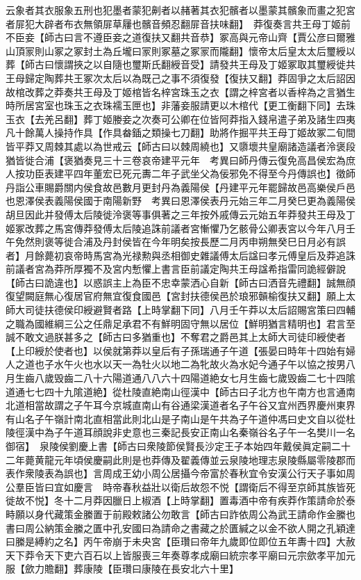 云象者其衣服象五刑也犯墨者蒙犯劓者以赭著其衣犯髕者以墨蒙其髕象而畫之犯宮者屝犯大辟者布衣無領屝草屨也髕音頻忍翻屝音扶味翻】　莽復奏言共王母丁姬前不臣妾【師古曰言不遵臣妾之道復扶又翻共音恭】冢高與元帝山齊【賈公彦曰爾雅山頂冡則山冢之冢封土為丘壠曰冡則冢墓之冢冡而隴翻】懷帝太后皇太太后璽綬以葬【師古曰懷謂挾之以自隨也璽斯氏翻綬音受】請發共王母及丁姬冢取其璽綬徙共王母歸定陶葬共王冢次太后以為既己之事不須復發【復扶又翻】莽固爭之太后詔因故棺改葬之莽奏共王母及丁姬棺皆名梓宮珠玉之衣【謂之梓宮者以香梓為之言猶生時所居宮室也珠玉之衣珠襦玉匣也】非藩妾服請更以木棺代【更工衡翻下同】去珠玉衣【去羌呂翻】葬丁姬媵妾之次奏可公卿在位皆阿莽指入錢帛遣子弟及諸生四夷凡十餘萬人操持作具【作具畚鍤之類操七刀翻】助將作掘平共王母丁姬故冢二旬間皆平莽又周棘其處以為世戒云【師古曰以棘周繞也】又隳壞共皇廟諸造議者泠褒段猶皆徙合浦【褒猶奏見三十三卷哀帝建平元年　考異曰師丹傳云復免高昌侯宏為庶人按功臣表建平四年董宏已死元夀二年子武坐父為佞邪免不得至今丹傳誤也】徵師丹詣公車賜爵關内侯食故邑數月更封丹為義陽侯【丹建平元年罷歸故邑高樂侯戶邑也恩澤侯表義陽侯國于南陽新野　考異曰恩澤侯表丹元始三年二月癸巳更為義陽侯胡旦因此并發傅太后陵徙泠褒等事俱著之三年按外戚傳云元始五年莽發共王母及丁姬冢改葬之馬宮傳莽發傅太后陵追誅前議者宮慚懼乃乞骸骨公卿表宮以今年八月壬午免然則褒等徙合浦及丹封侯皆在今年明矣按長歷二月丙申朔無癸巳日月必有誤者】月餘薨初哀帝時馬宮為光禄勲與丞相御史雜議傅太后諡曰孝元傅皇后及莽追誅前議者宮為莽所厚獨不及宮内慙懼上書言臣前議定陶共王母諡希指雷同詭經僻說【師古曰詭違也】以惑誤主上為臣不忠幸蒙洒心自新【師古曰洒音先禮翻】誠無顔復望闕庭無心復居官府無宜復食國邑【宮封扶德侯邑於琅邪贑榆復扶又翻】願上太師大司徒扶德侯印綬避賢者路【上時掌翻下同】八月壬午莽以太后詔賜宮策曰四輔之職為國維綱三公之任鼎足承君不有鮮明固守無以居位【鮮明猶言精明也】君言至誠不敢文過朕甚多之【師古曰多猶重也】不奪君之爵邑其上太師大司徒印綬使者【上印綬於使者也】以侯就第莽以皇后有子孫瑞通子午道【張晏曰時年十四始有婦人之道也子水午火也水以天一為牡火以地二為牝故火為水妃今通子午以協之按男八月生齒八歲毁齒二八十六陽道通八八六十四陽道絶女七月生齒七歲毁齒二七十四隂道通七七四十九隂道絶】從杜陵直絶南山徑漢中【師古曰子北方也午南方也言通南北道相當故謂之子午耳今京城直南山有谷通梁漢道者名子午谷又宜州西界慶州東界有山名子午嶺計南北直相當此則北山是子南山是午共為子午道仲馮曰史文自以從杜陵徑漢中為子午道耳顔說非史意也三秦記長安正南山名秦嶺谷名子午一名樊川一名御宿】　泉陵侯劉慶上書【師古曰衆陵節侯賢長沙定王子本始四年戴侯眞定嗣二十二年薨黄龍元年頃侯慶嗣此則是也莽傳及翟義傳並云泉陵地理志泉陵縣屬零陵郡而表作衆陵表為誤也】言周成王幼小周公居攝今帝富於春秋宜令安漢公行天子事如周公羣臣皆曰宜如慶言　時帝春秋益壯以衛后故怨不悦【謂衛后不得至京師其族皆死徙故不悦】冬十二月莽因臘日上椒酒【上時掌翻】置毒酒中帝有疾莽作策請命於泰畤願以身代藏策金縢置于前殿敕諸公勿敢言【師古曰詐依周公為武王請命作金縢也書曰周公納策金縢之匱中孔安國曰為請命之書藏之於匱緘之以金不欲人開之孔穎達曰縢是縛約之名】丙午帝崩于未央宮【臣瓚曰帝年九歲即位即位五年夀十四】大赦天下莽令天下吏六百石以上皆服喪三年奏尊孝成廟曰統宗孝平廟曰元宗歛孝平加元服【歛力贍翻】葬康陵【臣瓚曰康陵在長安北六十里】

